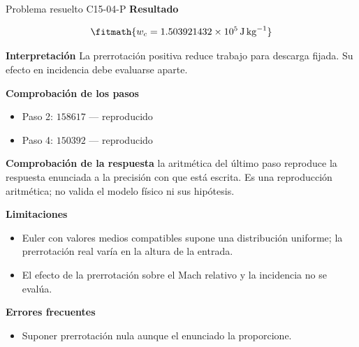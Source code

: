 \documentclass[10pt,openany]{book}
\begin{document}
\begin{studiumworked}{Problema resuelto C15-04-P}
\noindent\textbf{Resultado}

\[
\fitmath{w_c=1.503921432\times10^{5}\,\mathrm{J}\,\mathrm{kg}^{-1}}
\]

\noindent\textbf{Interpretación}
La prerrotación positiva reduce trabajo para descarga fijada. Su efecto en incidencia debe evaluarse aparte.

\noindent\textbf{Comprobación de los pasos}
\begin{itemize}
\item Paso 2: $158617$ — reproducido
\item Paso 4: $150392$ — reproducido
\end{itemize}

\noindent\textbf{Comprobación de la respuesta} la aritmética del último paso reproduce la respuesta enunciada a la precisión con que está escrita. Es una reproducción aritmética; no valida el modelo físico ni sus hipótesis.

\noindent\textbf{Limitaciones}
\begin{itemize}
\item Euler con valores medios compatibles supone una distribución uniforme; la prerrotación real varía en la altura de la entrada.
\item El efecto de la prerrotación sobre el Mach relativo y la incidencia no se evalúa.
\end{itemize}

\noindent\textbf{Errores frecuentes}
\begin{itemize}
\item Suponer prerrotación nula aunque el enunciado la proporcione.
\end{itemize}
\end{studiumworked}
\end{document}
